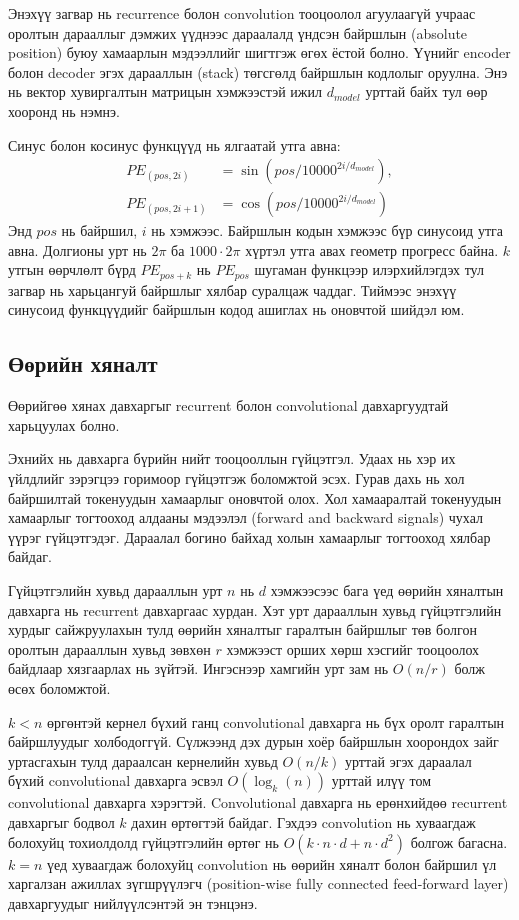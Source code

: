 \documentclass[11pt,a4paper]{article}
\begin{document}
Энэхүү загвар нь recurrence болон convolution тооцоолол агуулаагүй учраас оролтын дарааллыг дэмжих үүднээс дараалалд үндсэн байршлын (absolute position) буюу хамаарлын мэдээллийг шигтгэж өгөх ёстой болно. Үүнийг encoder болон decoder эгэх дарааллын (stack) төгсгөлд байршлын кодлолыг оруулна. Энэ нь вектор хувиргалтын матрицын хэмжээстэй ижил \(d_{model}\) урттай байх тул өөр хооронд нь нэмнэ.

Синус болон косинус функцүүд нь ялгаатай утга авна:
\begin{align*}
PE_{(pos,2i)}&=\sin(pos/10000^{2i/d_{model}}),\\
  PE_{(pos,2i+1)}&=\cos(pos/10000^{2i/d_{model}})
\end{align*}
Энд \(pos\) нь байршил, \(i\) нь хэмжээс. Байршлын кодын хэмжээс бүр синусоид утга авна. Долгионы урт нь \(2\pi\) ба \(1000\cdot2\pi\) хүртэл утга авах геометр прогресс байна. \(k\) утгын өөрчлөлт бүрд \(PE_{pos+k}\) нь \(PE_{pos}\) шугаман функцээр илэрхийлэгдэх тул загвар нь харьцангуй байршлыг хялбар суралцаж чаддаг. Тиймээс энэхүү синусоид функцүүдийг байршлын кодод ашиглах нь оновчтой шийдэл юм.
\subsection{Өөрийн хяналт}
\label{sec:orge64cce9}

Өөрийгөө хянах давхаргыг recurrent болон convolutional давхаргуудтай харьцуулах болно.

Эхнийх нь давхарга бүрийн нийт тооцооллын гүйцэтгэл. Удаах нь хэр их үйлдлийг зэрэгцээ горимоор гүйцэтгэж боломжтой эсэх. Гурав дахь нь хол байршилтай токенуудын хамаарлыг оновчтой олох. Хол хамааралтай токенуудын хамаарлыг тогтооход алдааны мэдээлэл (forward and backward signals) чухал үүрэг гүйцэтгэдэг. Дараалал богино байхад холын хамаарлыг тогтооход хялбар байдаг.

Гүйцэтгэлийн хувьд дарааллын урт \(n\) нь \(d\) хэмжээсээс бага үед өөрийн хяналтын давхарга нь recurrent давхаргаас хурдан. Хэт урт дарааллын хувьд гүйцэтгэлийн хурдыг сайжруулахын тулд өөрийн хяналтыг гаралтын байршлыг төв болгон оролтын дарааллын хувьд зөвхөн \(r\) хэмжээст орших хөрш хэсгийг тооцоолох байдлаар хязгаарлах нь зүйтэй. Ингэснээр хамгийн урт зам нь \(O(n/r)\) болж өсөх боломжтой.

\(k<n\) өргөнтэй кернел бүхий ганц convolutional давхарга нь бүх оролт гаралтын байршлуудыг холбодоггүй. Сүлжээнд дэх дурын хоёр байршлын хоорондох зайг уртасгахын тулд дараалсан кернелийн хувьд \(O(n/k)\) урттай эгэх дараалал бүхий convolutional давхарга эсвэл \(O(\log_k(n))\) урттай илүү том convolutional давхарга хэрэгтэй. Convolutional давхарга нь ерөнхийдөө recurrent давхаргыг бодвол \(k\) дахин өртөгтэй байдаг. Гэхдээ convolution нь хуваагдаж болохуйц тохиолдолд гүйцэтгэлийн өртөг нь \(O(k\cdot n\cdot d+n\cdot d^2)\) болгож багасна. \(k=n\) үед хуваагдаж болохуйц convolution нь өөрийн хяналт болон байршил үл харгалзан ажиллах зүгшрүүлэгч (position-wise fully connected feed-forward layer) давхаргуудыг нийлүүлсэнтэй эн тэнцэнэ.
\end{document}

